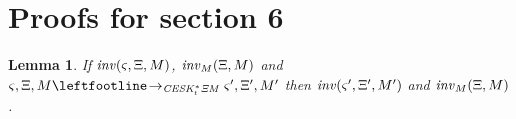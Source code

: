 \documentclass{article}
\newtheorem{lemma}{Lemma}
\begin{document}
\section{Proofs for section 6}
\begin{lemma}
  If $\mathit{inv}(\varsigma,\Xi,M)$, $\mathit{inv}_M(\Xi,M)$ and
  $\mstate,\mktab,\mmemo \stepto_{\CESKKMstart} \mstate',\mktab',\mmemo'$
  then $\mathit{inv}(\varsigma',\Xi',M')$ and $\mathit{inv}_M(\Xi,M)$.
\end{lemma}

\end{document}
